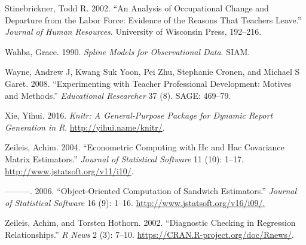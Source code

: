 \documentclass[12pt,]{article}
\begin{document}
\hypertarget{ref-stinebrickner}{}
Stinebrickner, Todd R. 2002. ``An Analysis of Occupational Change and
Departure from the Labor Force: Evidence of the Reasons That Teachers
Leave.'' \emph{Journal of Human Resources}. University of Wisconsin
Press, 192--216.

\hypertarget{ref-wahba}{}
Wahba, Grace. 1990. \emph{Spline Models for Observational Data}. SIAM.

\hypertarget{ref-wayne}{}
Wayne, Andrew J, Kwang Suk Yoon, Pei Zhu, Stephanie Cronen, and Michael
S Garet. 2008. ``Experimenting with Teacher Professional Development:
Motives and Methods.'' \emph{Educational Researcher} 37 (8). SAGE:
469--79.

\hypertarget{ref-xie}{}
Xie, Yihui. 2016. \emph{Knitr: A General-Purpose Package for Dynamic
Report Generation in R}. \url{http://yihui.name/knitr/}.

\hypertarget{ref-zeileis2004}{}
Zeileis, Achim. 2004. ``Econometric Computing with Hc and Hac Covariance
Matrix Estimators.'' \emph{Journal of Statistical Software} 11 (10):
1--17. \url{http://www.jstatsoft.org/v11/i10/}.

\hypertarget{ref-zeileis2006}{}
---------. 2006. ``Object-Oriented Computation of Sandwich Estimators.''
\emph{Journal of Statistical Software} 16 (9): 1--16.
\url{http://www.jstatsoft.org/v16/i09/.}

\hypertarget{ref-zeileis2002}{}
Zeileis, Achim, and Torsten Hothorn. 2002. ``Diagnostic Checking in
Regression Relationships.'' \emph{R News} 2 (3): 7--10.
\url{https://CRAN.R-project.org/doc/Rnews/}.
\end{document}

